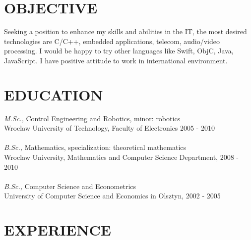 \documentclass[margin, 10pt]{res} %
\begin{document}
\begin{resume}

 
\section{OBJECTIVE}  

Seeking a position to enhance my skills and abilities in the IT, the most desired technologies are C/C++, embedded applications, telecom, audio/video processing. I would be happy to try other languages like Swift, ObjC, Java, JavaScript. I have positive attitude to work in international environment.


\section{EDUCATION}

{\sl M.Sc.,} Control Engineering and Robotics, minor: robotics \\
Wroclaw University of Technology, Faculty of Electronics \hfill 2005 - 2010\\
\\
{\sl B.Sc.,} Mathematics, specialization: theoretical mathematics\\
Wroclaw University, Mathematics and Computer Science Department, \hfill 2008 - 2010\\
\\
{\sl B.Sc.,} Computer Science and Econometrics\\
University of Computer Science and Economics in Olsztyn, \hfill 2002 - 2005\\

 
\section{EXPERIENCE}


\end{resume}
\end{document}
